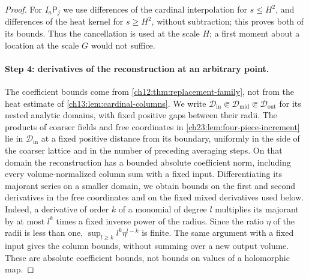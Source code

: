 \begin{proof}
For $I_a\mathsf P_j$ we use differences of the cardinal interpolation for $s\le H^2$, and differences of the heat kernel for $s\ge H^2$, without subtraction; this proves both of its bounds. Thus the cancellation is used at the scale $H$; a first moment about a location at the scale $G$ would not suffice.

\paragraph{Step 4: derivatives of the reconstruction at an arbitrary point.}
The coefficient bounds come from \cref{ch12:thm:replacement-family}, not from the heat estimate of \cref{ch13:lem:cardinal-columns}. We write $\mathscr D_{\mathrm{in}}\Subset\mathscr D_{\mathrm{mid}}\Subset\mathscr D_{\mathrm{out}}$ for its nested analytic domains, with fixed positive gaps between their radii. The products of coarser fields and free coordinates in \cref{ch23:lem:four-piece-increment} lie in $\mathscr D_{\mathrm{in}}$ at a fixed positive distance from its boundary, uniformly in the side of the coarser lattice and in the number of preceding averaging steps. On that domain the reconstruction has a bounded absolute coefficient norm, including every volume-normalized column sum with a fixed input. Differentiating its majorant series on a smaller domain, we obtain bounds on the first and second derivatives in the free coordinates and on the fixed mixed derivatives used below. Indeed, a derivative of order $k$ of a monomial of degree $l$ multiplies its majorant by at most $l^k$ times a fixed inverse power of the radius. Since the ratio $\eta$ of the radii is less than one, $\sup_{l\ge k}l^k\eta^{l-k}$ is finite. The same argument with a fixed input gives the column bounds, without summing over a new output volume. These are absolute coefficient bounds, not bounds on values of a holomorphic map.


\end{proof}
